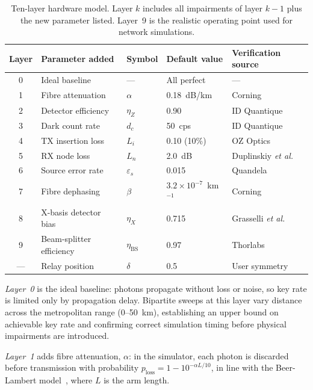 \documentclass[12pt]{article}
\begin{document}
\begin{table}[t]
\centering
\small
\begin{tabular}{cp{4.2cm}lp{2.8cm}p{3.5cm}}
\toprule
Layer & Parameter added & Symbol & Default value & Verification source \\
\midrule
0 & Ideal baseline & --- & All perfect & --- \\
1 & Fibre attenuation & $\alpha$ & 0.18~dB/km & Corning \cite{corning_smf28} \\
2 & Detector efficiency & $\eta_Z$ & 0.90 & ID Quantique \cite{idq_id281} \\
3 & Dark count rate & $d_c$ & 50~cps & ID Quantique \cite{idq_id281} \\
4 & TX insertion loss & $L_i$ & 0.10 (10\%) & OZ Optics \cite{ozoptics_dts0092} \\
5 & RX node loss & $L_n$ & 2.0~dB & Duplinskiy \textit{et al.} \cite{Duplinskiy_2017} \\
6 & Source error rate & $\varepsilon_s$ & 0.015 & Quandela \cite{QuandelaSPS} \\
7 & Fibre dephasing & $\beta$ & $3.2\times10^{-7}$~km$^{-1}$ & Corning \cite{corning_smf28} \\
8 & X-basis detector bias & $\eta_X$ & 0.715 & Grasselli \textit{et al.} \cite{Grasselli_2025} \\
9 & Beam-splitter efficiency & $\eta_\text{BS}$ & 0.97 & Thorlabs \cite{thorlabs_tn1550r5f2} \\
\midrule
--- & Relay position & $\delta$ & 0.5 & User symmetry \\
\bottomrule
\end{tabular}
\caption{Ten-layer hardware model. Layer $k$ includes all impairments of layer $k-1$ plus the new parameter listed. Layer~9 is the realistic operating point used for network simulations.}
\label{tab:layers}
\end{table}

\textit{Layer~0} is the ideal baseline: photons propagate without loss or noise, so key rate is limited only by propagation delay. Bipartite sweeps at this layer vary distance across the metropolitan range (0--50~km), establishing an upper bound on achievable key rate and confirming correct simulation timing before physical impairments are introduced.

\textit{Layer~1} adds fibre attenuation, $\alpha$: in the simulator, each photon is discarded before transmission with probability $p_\text{loss} = 1 - 10^{-\alpha L/10}$, in line with the Beer-Lambert model~\cite{Agrawal_2010}, where $L$ is the arm length.
\end{document}
